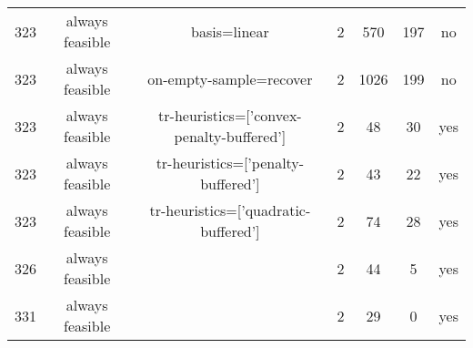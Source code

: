 \begin{scriptsize}
\begin{center}
\begin{longtable}{ccccccc}
323 & always feasible &                              basis=linear & 2 &    570 &    197 &      no\\
323 & always feasible &                   on-empty-sample=recover & 2 &   1026 &    199 &      no\\
323 & always feasible & tr-heuristics=['convex-penalty-buffered'] & 2 &     48 &     30 &     yes\\
323 & always feasible &        tr-heuristics=['penalty-buffered'] & 2 &     43 &     22 &     yes\\
323 & always feasible &      tr-heuristics=['quadratic-buffered'] & 2 &     74 &     28 &     yes\\
326 & always feasible &                                           & 2 &     44 &      5 &     yes\\
331 & always feasible &                                           & 2 &     29 &      0 &     yes
\end{longtable}
\end{center}
\end{scriptsize}
